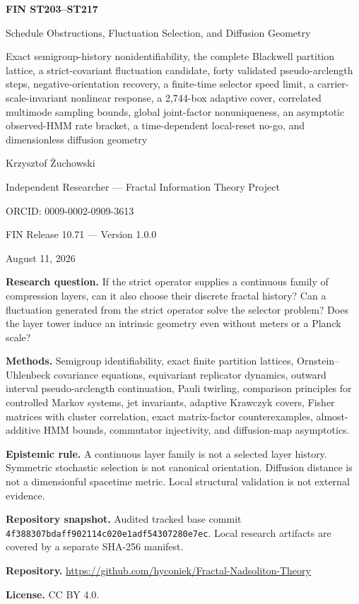 \documentclass[11pt,a4paper]{article}
\begin{document}
\begin{titlepage}
\centering
\vspace*{0.60cm}
{\LARGE\bfseries FIN ST203--ST217\par}
\vspace{0.24cm}
{\Large Schedule Obstructions, Fluctuation Selection, and Diffusion Geometry\par}
\vspace{0.34cm}
{\large Exact semigroup-history nonidentifiability, the complete Blackwell partition lattice, a strict-covariant fluctuation candidate, forty validated pseudo-arclength steps, negative-orientation recovery, a finite-time selector speed limit, a carrier-scale-invariant nonlinear response, a 2,744-box adaptive cover, correlated multimode sampling bounds, global joint-factor nonuniqueness, an asymptotic observed-HMM rate bracket, a time-dependent local-reset no-go, and dimensionless diffusion geometry\par}
\vspace{0.65cm}
{\Large Krzysztof \.{Z}uchowski\par}
\vspace{0.16cm}
{\large Independent Researcher --- Fractal Information Theory Project\par}
{\large ORCID: 0009-0002-0909-3613\par}
\vspace{0.45cm}
{\large FIN Release 10.71 --- Version 1.0.0\par}
{\large August 11, 2026\par}
\vfill
\begin{minipage}{0.93\textwidth}
\textbf{Research question.} If the strict operator supplies a continuous family of compression layers, can it also choose their discrete fractal history? Can a fluctuation generated from the strict operator solve the selector problem? Does the layer tower induce an intrinsic geometry even without meters or a Planck scale?\par
\textbf{Methods.} Semigroup identifiability, exact finite partition lattices, Ornstein--Uhlenbeck covariance equations, equivariant replicator dynamics, outward interval pseudo-arclength continuation, Pauli twirling, comparison principles for controlled Markov systems, jet invariants, adaptive Krawczyk covers, Fisher matrices with cluster correlation, exact matrix-factor counterexamples, almost-additive HMM bounds, commutator injectivity, and diffusion-map asymptotics.\par
\textbf{Epistemic rule.} A continuous layer family is not a selected layer history. Symmetric stochastic selection is not canonical orientation. Diffusion distance is not a dimensionful spacetime metric. Local structural validation is not external evidence.\par
\textbf{Repository snapshot.} Audited tracked base commit \texttt{4f388307bdaff902114c020e1adf54307280e7ec}. Local research artifacts are covered by a separate SHA-256 manifest.\par
\textbf{Repository.} \url{https://github.com/hyconiek/Fractal-Nadsoliton-Theory}\par
\textbf{License.} CC BY 4.0.
\end{minipage}
\end{titlepage}
\end{document}

